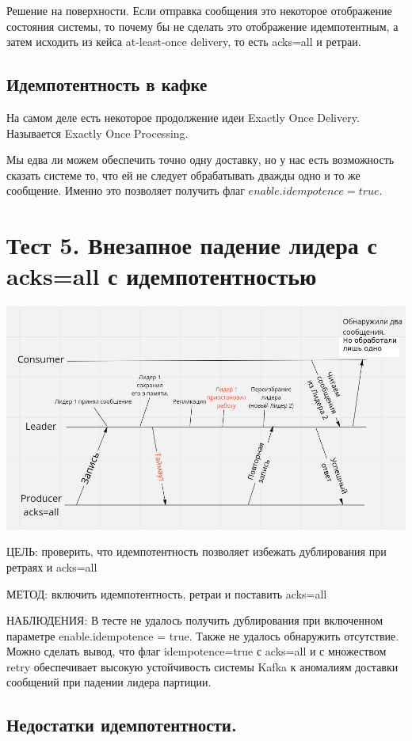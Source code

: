 \documentclass[11pt]{article}
\begin{document}
    Решение на поверхности. Если отправка сообщения это некоторое отображение состояния системы, то почему бы не сделать это отображение идемпотентным, а затем исходить из кейса at-least-once delivery, то есть acks=all и ретраи.

    \subsection{Идемпотентность в кафке}
    На самом деле есть некоторое продолжение идеи Exactly Once Delivery. Называется Exactly Once Processing.

    Мы едва ли можем обеспечить точно одну доставку, но у нас есть возможность сказать системе то, что ей не следует обрабатывать дважды одно и то же сообщение. Именно это позволяет получить флаг $enable.idempotence = true$.

    \section{Тест 5. Внезапное падение лидера с acks=all с идемпотентностью}

    \includegraphics[width=15cm]{test5}

    ЦЕЛЬ: проверить, что идемпотентность позволяет избежать дублирования при ретраях и acks=all

    МЕТОД: включить идемпотентность, ретраи и поставить acks=all

    НАБЛЮДЕНИЯ: В тесте не удалось получить дублирования при включенном параметре enable.idempotence = true. Также не
    удалось обнаружить отсутствие. Можно сделать вывод, что флаг idempotence=true с acks=all и с множеством retry
    обеспечивает высокую устойчивость системы Kafka к аномалиям доставки сообщений при падении лидера партиции.

    \subsection{Недостатки идемпотентности.}
\end{document}

